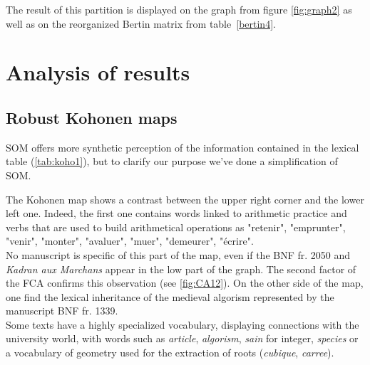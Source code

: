 \documentclass{elsarticle}
\begin{document}
The result of this partition is displayed on the graph from figure \ref{fig:graph2} as well as on the reorganized Bertin matrix from table~\ref{bertin4}.

\section{Analysis of results}\label{analysis}


\subsection{Robust Kohonen maps}

SOM offers more synthetic perception of the information contained in the lexical table (\ref{tab:koho1}), but to clarify our purpose we've done a simplification of SOM. %



The Kohonen map shows a contrast between the upper right corner and the lower left one.  
Indeed, the first one contains words linked to arithmetic practice and verbs that are used to build arithmetical operations as "retenir", "emprunter", "venir", "monter", "avaluer", "muer", "demeurer", "écrire".\\

No manuscript is specific of this part of the map, even if the BNF fr. 2050 and \textit{Kadran aux Marchans} appear in the low part of the graph. The second factor of the FCA confirms this observation (see \ref{fig:CA12}). On the other side of the map, one find the lexical inheritance of the medieval algorism represented by the manuscript BNF fr. 1339.\\

Some texts have a highly specialized vocabulary, displaying connections with the university world, with words such as \textit{article}, \textit{algorism}, \textit{sain} for integer, \textit{species} or a vocabulary of geometry used for the extraction of roots (\textit{cubique}, \textit{carree}).\\
\end{document}
